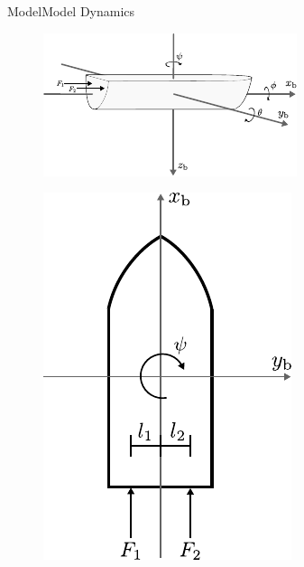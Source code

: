 \begin{frame}{Model}{Model Dynamics}
    \begin{minipage}{0.65\linewidth}
        \begin{figure}[H]
            \centering
            \includegraphics[width=1\linewidth]{figures/boat3DForces}
        \end{figure}        
    \end{minipage}\hfill      
    \begin{minipage}{0.3\linewidth}
        \begin{figure}[H]
            \centering
            \includegraphics[width=0.7\linewidth]{figures/boat2D}

\end{figure}
\end{minipage}
\end{frame}
